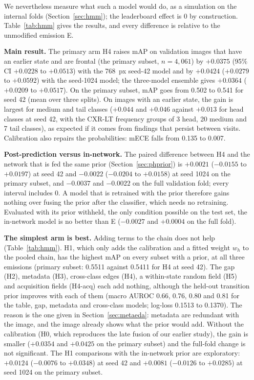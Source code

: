 \documentclass[conference]{IEEEtran}
\begin{document}
We nevertheless measure what such a model would do, as a simulation on the internal folds (Section~\ref{sec:hmm}); the leaderboard effect is 0 by construction. Table~\ref{tab:hmm} gives the results, and every difference is relative to the unmodified emission E.

\textbf{Main result.} The primary arm H4 raises mAP on validation images that have an earlier state and are frontal (the primary subset, $n = 4{,}061$) by $+0.0375$ (95\% CI $+0.0228$ to $+0.0513$) with the 768~px seed-42 model and by $+0.0424$ ($+0.0279$ to $+0.0592$) with the seed-1024 model; the three-model ensemble gives $+0.0364$ ($+0.0209$ to $+0.0517$). On the primary subset, mAP goes from 0.502 to 0.541 for seed 42 (mean over three splits). On images with an earlier state, the gain is largest for medium and tail classes ($+0.044$ and $+0.046$ against $+0.013$ for head classes at seed 42, with the CXR-LT frequency groups of 3 head, 20 medium and 7 tail classes), as expected if it comes from findings that persist between visits. Calibration also repairs the probabilities: mECE falls from 0.135 to 0.007.

\textbf{Post-prediction versus in-network.} The paired difference between H4 and the network that is fed the same prior (Section~\ref{sec:phprior}) is $+0.0021$ ($-0.0155$ to $+0.0197$) at seed 42 and $-0.0022$ ($-0.0204$ to $+0.0158$) at seed 1024 on the primary subset, and $-0.0037$ and $-0.0022$ on the full validation fold; every interval includes 0. A model that is retrained with the prior therefore gains nothing over fusing the prior after the classifier, which needs no retraining. Evaluated with its prior withheld, the only condition possible on the test set, the in-network model is no better than E ($-0.0027$ and $+0.0004$ on the full fold).

\textbf{The simplest arm is best.} Adding terms to the chain does not help (Table~\ref{tab:hmm}). H1, which only adds the calibration and a fitted weight $w_h$ to the pooled chain, has the highest mAP on every subset with a prior, at all three emissions (primary subset: 0.5511 against 0.5411 for H4 at seed 42). The gap (H2), metadata (H3), cross-class edges (H4), a within-state random field (H5) and acquisition fields (H4-acq) each add nothing, although the held-out transition prior improves with each of them (macro AUROC 0.66, 0.76, 0.80 and 0.81 for the table, gap, metadata and cross-class models; log-loss 0.1513 to 0.1370). The reason is the one given in Section~\ref{sec:metaeda}: metadata are redundant with the image, and the image already shows what the prior would add. Without the calibration (H0, which reproduces the late fusion of our earlier study), the gain is smaller ($+0.0354$ and $+0.0425$ on the primary subset) and the full-fold change is not significant. The H1 comparisons with the in-network prior are exploratory: $+0.0124$ ($-0.0076$ to $+0.0348$) at seed 42 and $+0.0081$ ($-0.0126$ to $+0.0285$) at seed 1024 on the primary subset.
\end{document}
